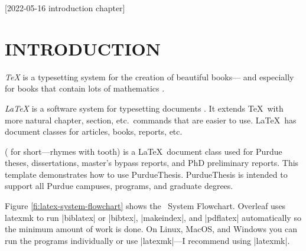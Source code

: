 [2022-05-16 introduction chapter]

\chapter{INTRODUCTION}


{\sl\TeX\/} is a typesetting system for the creation of beautiful books---%
and especially for books that contain lots of mathematics
\cite[page v]{knuth2012}.

{\sl\LaTeX\/} is a software system for typesetting documents
\cite[back cover]{lamport1994}.
It extends \TeX\ with more natural chapter,
section,
etc.~commands that are easier to use.
\LaTeX\ has document classes for
articles,
books,
reports,
etc.

{\sl\PurdueThesisLogo\/}
({\sl\PuThLogo} for short---rhymes with tooth)
is a \LaTeX\ document class used for Purdue theses,
dissertations,
master’s bypass reports,
and PhD preliminary reports.
This template demonstrates how to use PurdueThesis.
PurdueThesis is intended to support all Purdue campuses,
programs,
and graduate degrees.

Figure \ref{fi:latex-system-flowchart} shows the \LaTeXLogo\ System Flowchart.
Overleaf
\cite{overleaf}
uses latexmk
\cite{latexmk}
to run
|biblatex| or |bibtex|,
|makeindex|,
and |pdflatex| automatically
so the minimum amount of work is done.
On Linux,
MacOS,
and Windows you can run the programs individually
or use |latexmk|---I recommend using |latexmk|.
  
